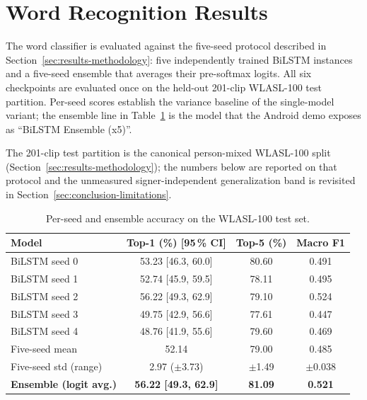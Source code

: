 \section{Word Recognition Results}
\label{sec:results-words}

The word classifier is evaluated against the five-seed protocol described
in Section~\ref{sec:results-methodology}: five independently trained
BiLSTM instances and a five-seed ensemble that averages their pre-softmax
logits. All six checkpoints are evaluated once on the held-out 201-clip
WLASL-100 test partition. Per-seed scores establish the variance baseline
of the single-model variant; the ensemble line in
Table~\ref{tab:results-words-seeds} is the model that the Android demo
exposes as ``BiLSTM Ensemble (x5)''.

The 201-clip test partition is the canonical person-mixed WLASL-100
split (Section~\ref{sec:results-methodology}); the numbers below are
reported on that protocol and the unmeasured signer-independent
generalization band is revisited in
Section~\ref{sec:conclusion-limitations}.

\begin{table}[!ht]
\centering
\caption{Per-seed and ensemble accuracy on the WLASL-100 test set.}
\label{tab:results-words-seeds}
\begin{tabular}{lccc}
\toprule
\textbf{Model} & \textbf{Top-1 (\%) [95\,\% CI]} & \textbf{Top-5 (\%)} & \textbf{Macro F1} \\
\midrule
BiLSTM seed 0           & 53.23 [46.3, 60.0] & 80.60 & 0.491 \\
BiLSTM seed 1           & 52.74 [45.9, 59.5] & 78.11 & 0.495 \\
BiLSTM seed 2           & 56.22 [49.3, 62.9] & 79.10 & 0.524 \\
BiLSTM seed 3           & 49.75 [42.9, 56.6] & 77.61 & 0.447 \\
BiLSTM seed 4           & 48.76 [41.9, 55.6] & 79.60 & 0.469 \\
\midrule
Five-seed mean          & 52.14 & 79.00 & 0.485 \\
Five-seed std (range)   & 2.97 ($\pm$3.73) & $\pm$1.49 & $\pm$0.038 \\
\midrule
\textbf{Ensemble (logit avg.)} & \textbf{56.22 [49.3, 62.9]} & \textbf{81.09} & \textbf{0.521} \\
\bottomrule
\end{tabular}
\end{table}

